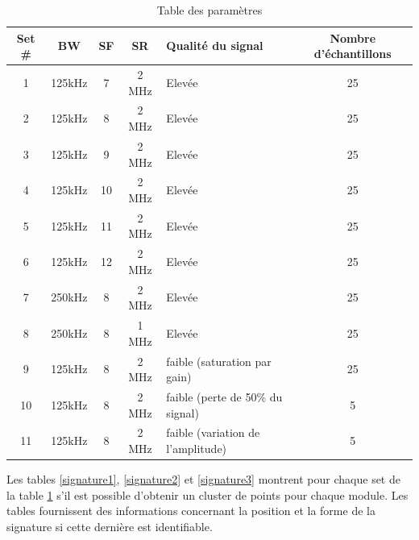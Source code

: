 \begin{table}[h]
\centering
\begin{tabular}{|c|c|c|c|p{3cm}|c|}
\hline
Set \# & BW & SF & SR & Qualité du signal & Nombre d'échantillons\\
\hline
1  & 125kHz & 7 & 2 MHz & Elevée & 25\\
\hline
2  & 125kHz & 8 & 2 MHz & Elevée & 25\\
\hline
3  & 125kHz & 9 & 2 MHz & Elevée & 25\\
\hline
4  & 125kHz & 10 & 2 MHz & Elevée & 25\\
\hline
5  & 125kHz & 11 & 2 MHz & Elevée & 25\\
\hline
6  & 125kHz & 12 & 2 MHz & Elevée & 25\\
\hline
7  & 250kHz & 8 & 2 MHz & Elevée & 25\\
\hline
8  & 250kHz & 8 & 1 MHz & Elevée & 25\\
\hline
9  &  125kHz & 8 & 2 MHz & faible (saturation par gain) & 25\\
\hline
10  & 125kHz & 8 & 2 MHz & faible (perte de 50\% du signal) & 5\\
\hline
11  & 125kHz & 8 & 2 MHz & faible (variation de l'amplitude) & 5\\
\hline
\end{tabular}
\caption{Table des paramètres}
\label{set}
\end{table}

Les tables \ref{signature1}, \ref{signature2} et \ref{signature3} montrent pour chaque set de la table \ref{set} s'il est possible d'obtenir un cluster de points pour chaque module. Les tables fournissent des informations concernant la position et la forme de la signature si cette dernière est identifiable.

\newpage

